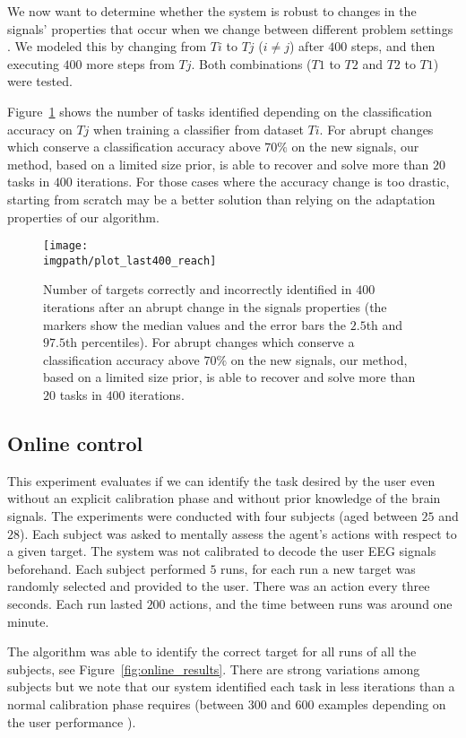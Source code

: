 We now want to determine whether the system is robust to changes in the signals' properties that occur when we change between different problem settings \cite{iturrate2013task}. We modeled this by changing from $Ti$ to $Tj$ ($i \neq j$) after $400$ steps, and then executing $400$ more steps from $Tj$. Both combinations ($T1$ to $T2$ and $T2$ to $T1$) were tested.

Figure~\ref{fig:stage2} shows the number of tasks identified depending on the classification accuracy on $Tj$ when training a classifier from dataset $Ti$. For abrupt changes which conserve a classification accuracy above $70\%$ on the new signals, our method, based on a limited size prior, is able to recover and solve more than $20$ tasks in $400$ iterations. For those cases where the accuracy change is too drastic, starting from scratch may be a better solution than relying on the adaptation properties of our algorithm.

\begin{figure}[!ht]
    \centering
    \texttt{[image: \\imgpath/plot\_last400\_reach]}
    \caption{Number of targets correctly and incorrectly identified in $400$ iterations after an abrupt change in the signals properties (the markers show the median values and the error bars the $2.5$th and $97.5$th percentiles). For abrupt changes which conserve a classification accuracy above $70\%$ on the new signals, our method, based on a limited size prior, is able to recover and solve more than $20$ tasks in $400$ iterations.}
    \label{fig:stage2}
\end{figure}

\subsection{Online control}

This experiment evaluates if we can identify the task desired by the user even without an explicit calibration phase and without prior knowledge of the brain signals. The experiments were conducted with four subjects (aged between $25$ and $28$). Each subject was asked to mentally assess the agent's actions with respect to a given target. The system was not calibrated to decode the user EEG signals beforehand. Each subject performed $5$ runs, for each run a new target was randomly selected and provided to the user. There was an action every three seconds. Each run lasted $200$ actions, and the time between runs was around one minute.

The algorithm was able to identify the correct target for all runs of all the subjects, see Figure~\ref{fig:online_results}. There are strong variations among subjects but we note that our system identified each task in less iterations than a normal calibration phase requires (between 300 and 600 examples depending on the user performance \cite{chavarriaga2010learning,iturrate2010single}).

